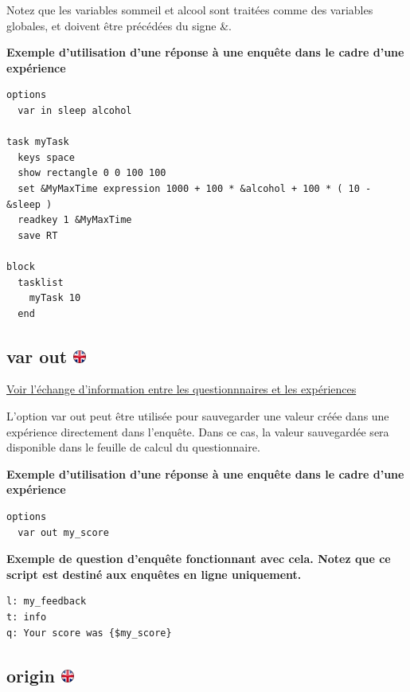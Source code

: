 \documentclass[
]{book}
\begin{document}
Notez que les variables sommeil et alcool sont traitées comme des variables globales, et doivent être précédées du signe \&.

\textbf{Exemple d'utilisation d'une réponse à une enquête dans le cadre d'une expérience}

\begin{verbatim}
options
  var in sleep alcohol

task myTask
  keys space
  show rectangle 0 0 100 100
  set &MyMaxTime expression 1000 + 100 * &alcohol + 100 * ( 10 - &sleep )
  readkey 1 &MyMaxTime
  save RT

block
  tasklist
    myTask 10
  end
\end{verbatim}

\hypertarget{var-out}{%
\subsection[var out ]{\texorpdfstring{var out \href{https://www.psytoolkit.org/doc3.4.0/syntax.html\#_var_out}{\protect\includegraphics{img/ukflag.png}}}{var out }}\label{var-out}}

\protect\hyperlink{s11}{Voir l'échange d'information entre les questionnnaires et les expériences}

L'option var out peut être utilisée pour sauvegarder une valeur créée dans une expérience directement dans l'enquête. Dans ce cas, la valeur sauvegardée sera disponible dans le feuille de calcul du questionnaire.

\textbf{Exemple d'utilisation d'une réponse à une enquête dans le cadre d'une expérience}

\begin{verbatim}
options
  var out my_score
\end{verbatim}

\textbf{Exemple de question d'enquête fonctionnant avec cela. Notez que ce script est destiné aux enquêtes en ligne uniquement.}

\begin{verbatim}
l: my_feedback
t: info
q: Your score was {$my_score}
\end{verbatim}

\hypertarget{origin}{%
\subsection[origin ]{\texorpdfstring{origin \href{https://www.psytoolkit.org/doc3.4.0/syntax.html\#options-origin}{\protect\includegraphics{img/ukflag.png}}}{origin }}\label{origin}}
\end{document}

